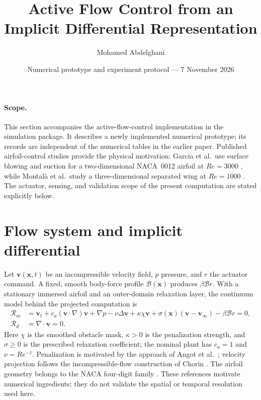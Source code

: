 \documentclass[10pt]{article}
\title{Active Flow Control from an Implicit Differential Representation}
\author{Mohamed Abdelghani}
\date{Numerical prototype and experiment protocol --- 7 November 2026}
\begin{document}
\maketitle

\paragraph{Scope.}
This section accompanies the active-flow-control implementation in the
simulation package. It describes a newly implemented numerical prototype;
its records are independent of the numerical tables in the earlier paper.
Published airfoil-control studies provide the physical motivation:
Garcia et al.\ use surface blowing and suction for a two-dimensional
NACA~0012 airfoil at $Re=3000$ \cite{Garcia2025Airfoil}, while
Montal\`a et al.\ study a three-dimensional separated wing at $Re=1000$
\cite{Montala2025Wing}. The actuator, sensing, and validation scope of the
present computation are stated explicitly below.

\section{Flow system and implicit differential}
Let $\bm v(\bm x,t)$ be an incompressible velocity field, $p$ pressure,
and $r$ the actuator command. A fixed, smooth body-force profile
$\mathcal B(\bm x)$ produces $\beta\mathcal B r$. With a stationary immersed
airfoil and an outer-domain relaxation layer, the continuum model behind
the projected computation is
\begin{align}
\mathcal R_m &={\bm v}_t+
 c_a(\bm v\cdot\nabla)\bm v+\nabla p-
 \nu\Delta\bm v+\kappa\chi\bm v
 +\sigma(\bm x)(\bm v-\bm v_\infty)-\beta\mathcal B r=0,
 \label{eq:afc_ns}\\
\mathcal R_d&=\nabla\cdot\bm v=0.
 \label{eq:afc_div}
\end{align}
Here $\chi$ is the smoothed obstacle mask, $\kappa>0$ is the
penalization strength, and $\sigma\geq0$ is the prescribed relaxation
coefficient; the nominal plant has $c_a=1$ and $\nu=Re^{-1}$.
Penalization is motivated by the approach of
Angot et al.\ \cite{Angot1999Penalization}; velocity projection follows
the incompressible-flow construction of Chorin \cite{Chorin1968Projection}.
The airfoil geometry belongs to the NACA four-digit family
\cite{Jacobs1933NACA}. These references motivate numerical ingredients;
they do not validate the spatial or temporal resolution used here.
\end{document}
